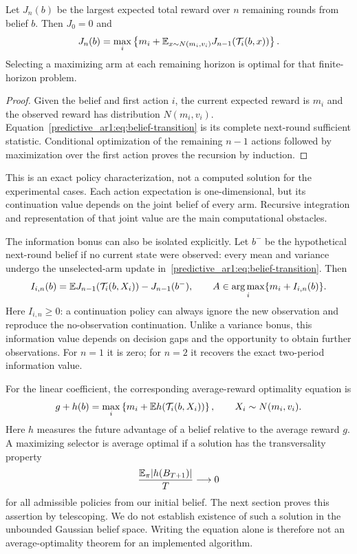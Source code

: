 \begin{proposition}
Let $J_n(b)$ be the largest expected total reward over $n$ remaining rounds from belief $b$. Then $J_0=0$ and
\begin{equation}
J_n(b)=\max_i\left\{m_i+\mathbb E_{x\sim N(m_i,v_i)}J_{n-1}(\mathcal T_i(b,x))\right\}.
\label{predictive_ar1:eq:finite-bellman}
\end{equation}
Selecting a maximizing arm at each remaining horizon is optimal for that finite-horizon problem.
\end{proposition}
\begin{proof}
Given the belief and first action $i$, the current expected reward is $m_i$ and the observed reward has distribution $N(m_i,v_i)$. Equation~\eqref{predictive_ar1:eq:belief-transition} is its complete next-round sufficient statistic. Conditional optimization of the remaining $n-1$ actions followed by maximization over the first action proves the recursion by induction.
\end{proof}
This is an exact policy characterization, not a computed solution for the experimental cases. Each action expectation is one-dimensional, but its continuation value depends on the joint belief of every arm. Recursive integration and representation of that joint value are the main computational obstacles.

The information bonus can also be isolated explicitly. Let $b^-$ be the hypothetical next-round belief if no current state were observed: every mean and variance undergo the unselected-arm update in~\eqref{predictive_ar1:eq:belief-transition}. Then
\[
I_{i,n}(b)=\mathbb E J_{n-1}(\mathcal T_i(b,X_i))-J_{n-1}(b^-),
\qquad A\in\operatorname*{arg\,max}_i\{m_i+I_{i,n}(b)\}.
\]
Here $I_{i,n}\geq0$: a continuation policy can always ignore the new observation and reproduce the no-observation continuation. Unlike a variance bonus, this information value depends on decision gaps and the opportunity to obtain further observations. For $n=1$ it is zero; for $n=2$ it recovers the exact two-period information value.

For the linear coefficient, the corresponding average-reward optimality equation is
\begin{equation}
g+h(b)=\max_i\left\{m_i+\mathbb E h(\mathcal T_i(b,X_i))\right\},
\qquad X_i\sim N(m_i,v_i).
\label{predictive_ar1:eq:average-bellman}
\end{equation}
Here $h$ measures the future advantage of a belief relative to the average reward $g$. A maximizing selector is average optimal if a solution has the transversality property
\begin{equation}
\frac{\mathbb E_\pi|h(B_{T+1})|}{T}\longrightarrow0
\label{predictive_ar1:eq:transversality}
\end{equation}
for all admissible policies from our initial belief. The next section proves this assertion by telescoping. We do not establish existence of such a solution in the unbounded Gaussian belief space. Writing the equation alone is therefore not an average-optimality theorem for an implemented algorithm.

